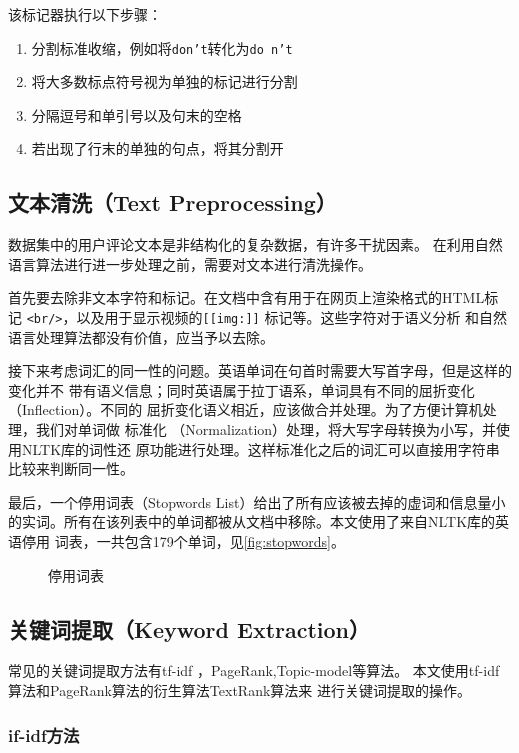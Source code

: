 该标记器执行以下步骤：
\begin{enumerate}
\item 分割标准收缩，例如将\texttt{don't}转化为\texttt{do n't}
\item 将大多数标点符号视为单独的标记进行分割
\item 分隔逗号和单引号以及句末的空格
\item 若出现了行末的单独的句点，将其分割开
\end{enumerate}

\subsection{文本清洗（Text Preprocessing）}
数据集中的用户评论文本是非结构化的复杂数据，有许多干扰因素。
在利用自然语言算法进行进一步处理之前，需要对文本进行清洗操作。

首先要去除非文本字符和标记。在文档中含有用于在网页上渲染格式的HTML标记
\texttt{<br/>}，以及用于显示视频的\texttt{[[img:]]} 标记等。这些字符对于语义分析
和自然语言处理算法都没有价值，应当予以去除。

接下来考虑词汇的同一性的问题。英语单词在句首时需要大写首字母，但是这样的变化并不
带有语义信息；同时英语属于拉丁语系，单词具有不同的屈折变化（Inflection）。不同的
屈折变化语义相近，应该做合并处理。为了方便计算机处理，我们对单词做{\fKai
标准化} （Normalization）处理，将大写字母转换为小写，并使用NLTK库的{\fKai 词性还
原}功能进行处理。这样标准化之后的词汇可以直接用字符串比较来判断同一性。

最后，一个{\fKai 停用词表}（Stopwords List）给出了所有应该被去掉的虚词和信息量小
的实词。所有在该列表中的单词都被从文档中移除。本文使用了来自NLTK库的英语停用
词表，一共包含179个单词，见\autoref{fig:stopwords}。

\begin{figure}
    \noindent{}
\caption{停用词表}\label{fig:stopwords}
\end{figure}

\subsection{关键词提取（Keyword Extraction）}
常见的关键词提取方法有tf-idf ，PageRank,Topic-model等算法。
本文使用tf-idf算法和PageRank算法的衍生算法TextRank算法来
进行关键词提取的操作。

\subsubsection{if-idf方法}

